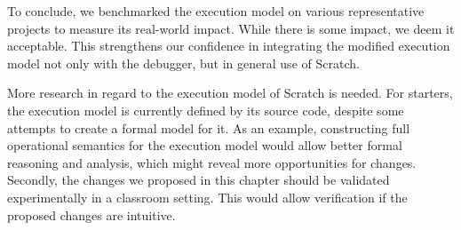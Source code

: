 \documentclass[main]{subfiles}
\begin{document}
To conclude, we benchmarked the execution model on various representative projects to measure its real-world impact.
While there is some impact, we deem it acceptable.
This strengthens our confidence in integrating the modified execution model not only with the debugger, but in general use of Scratch.

More research in regard to the execution model of Scratch is needed.
For starters, the execution model is currently defined by its source code, despite some attempts to create a formal model for it.
As an example, constructing full operational semantics for the execution model would allow better formal reasoning and analysis, which might reveal more opportunities for changes.
Secondly, the changes we proposed in this chapter should be validated experimentally in a classroom setting.
This would allow verification if the proposed changes are intuitive.
\end{document}
